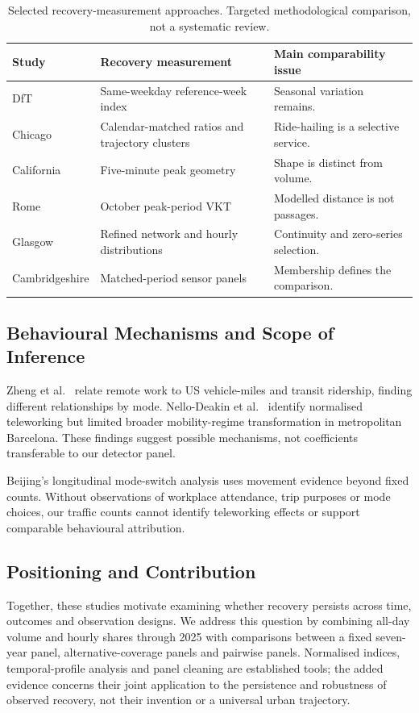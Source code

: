 \documentclass[]{interact}
\begin{document}
\begin{table}[!ht]
\caption{Selected recovery-measurement approaches. Targeted methodological comparison, not a systematic review.}
\label{tab:literature}\centering\footnotesize
\setlength{\tabcolsep}{3pt}
\begin{tabular}{p{1.8cm}p{2.7cm}p{3.4cm}}
\toprule
Study & Recovery measurement & Main comparability issue \\
\midrule
DfT \cite{dft} & Same-weekday reference-week index & Seasonal variation remains. \\
Chicago \cite{li2023} & Calendar-matched ratios and trajectory clusters & Ride-hailing is a selective service. \\
California \cite{gao2024} & Five-minute peak geometry & Shape is distinct from volume. \\
Rome \cite{aletta2022} & October peak-period VKT & Modelled distance is not passages. \\
Glasgow \cite{glasgow2025} & Refined network and hourly distributions & Continuity and zero-series selection. \\
Cambridgeshire \cite{cambridge2024} & Matched-period sensor panels & Membership defines the comparison. \\
\bottomrule
\end{tabular}
\end{table}

\subsection{Behavioural Mechanisms and Scope of Inference}
Zheng et al.\ \cite{zheng2024} relate remote work to US vehicle-miles and transit ridership, finding different relationships by mode. Nello-Deakin et al.\ \cite{nello2024} identify normalised teleworking but limited broader mobility-regime transformation in metropolitan Barcelona. These findings suggest possible mechanisms, not coefficients transferable to our detector panel.

Beijing's longitudinal mode-switch analysis \cite{beijing2024} uses movement evidence beyond fixed counts. Without observations of workplace attendance, trip purposes or mode choices, our traffic counts cannot identify teleworking effects or support comparable behavioural attribution.

\subsection{Positioning and Contribution}
Together, these studies motivate examining whether recovery persists across time, outcomes and observation designs. We address this question by combining all-day volume and hourly shares through 2025 with comparisons between a fixed seven-year panel, alternative-coverage panels and pairwise panels. Normalised indices, temporal-profile analysis and panel cleaning are established tools; the added evidence concerns their joint application to the persistence and robustness of observed recovery, not their invention or a universal urban trajectory.
\end{document}
